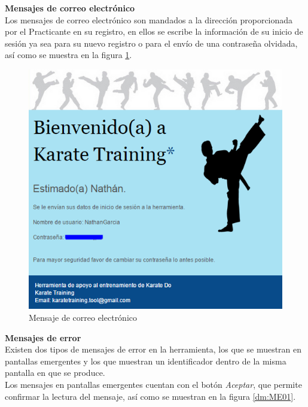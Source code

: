 \textbf{\textcolor[rgb]{0, 0, 0.545098}{Mensajes de correo electrónico}} \\

Los mensajes de correo electrónico son mandados a la dirección proporcionada por el Practicante en su registro, en ellos se escribe la información de su inicio de sesión ya sea para su nuevo registro o para el envío de una contraseña olvidada, así como se muestra en la figura \ref{dm:Correo}.  \\

\begin{figure}[H]
	\centering
		\includegraphics[scale=0.8]{./Figuras/Diseno_mensajes/Mensaje_correo}
	\caption{Mensaje de correo electrónico}
	\label{dm:Correo}
\end{figure}

\textbf{\textcolor[rgb]{0, 0, 0.545098}{Mensajes de error}} \\

Existen dos tipos de mensajes de error en la herramienta, los que se muestran en pantallas emergentes y los que muestran un identificador dentro de la misma pantalla en que se produce.\\

Los mensajes en pantallas emergentes cuentan con el botón \textit{Aceptar}, que permite confirmar la lectura del mensaje, así como se muestran en la figura \ref{dm:ME01}.\\

